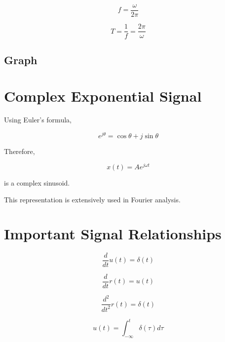 \[
\boxed{
f=\frac{\omega}{2\pi}
}
\]

\[
\boxed{
T=\frac{1}{f}=\frac{2\pi}{\omega}
}
\]


\subsection{Graph}

\begin{center}
\end{center}


\section{Complex Exponential Signal}

Using Euler's formula,

\[
\boxed{
e^{j\theta}=\cos\theta+j\sin\theta
}
\]

Therefore,

\[
\boxed{
x(t)=Ae^{j\omega t}
}
\]

is a complex sinusoid.

This representation is extensively used in Fourier analysis.


\section{Important Signal Relationships}

\[
\boxed{
\frac{d}{dt}u(t)=\delta(t)
}
\]

\[
\boxed{
\frac{d}{dt}r(t)=u(t)
}
\]

\[
\boxed{
\frac{d^2}{dt^2}r(t)=\delta(t)
}
\]

\[
\boxed{
u(t)=\int_{-\infty}^{t}\delta(\tau)d\tau
}
\]


